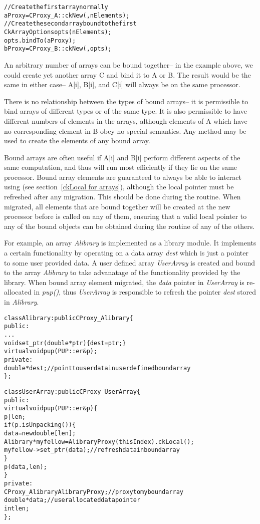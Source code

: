 \begin{alltt}
//Create the first array normally
  aProxy=CProxy_A::ckNew(,nElements);
//Create the second array bound to the first
  CkArrayOptions opts(nElements);
  opts.bindTo(aProxy);
  bProxy=CProxy_B::ckNew(,opts);
\end{alltt}

An arbitrary number of arrays can be bound together--
in the example above, we could create yet another array
C and bind it to A or B.  The result would be the same
in either case-- A[i], B[i], and C[i] will always be
on the same processor.

There is no relationship between the types of bound arrays--
it is permissible to bind arrays of different types or of the
same type.  It is also permissible to have different numbers
of elements in the arrays, although elements of A which have
no corresponding element in B obey no special semantics.
Any method may be used to create the elements of any bound
array.

Bound arrays are often useful if A[i] and B[i] perform different 
aspects of the same computation, and thus will run most efficiently 
if they lie on the same processor.  Bound array elements are guaranteed
to always be able to interact using  (see 
section~\ref{ckLocal for arrays}), although the local pointer must
be refreshed after any migration. This should be done during the 
routine. When migrated, all elements that are bound together will be created
at the new processor before  is called on any of them, ensuring that
a valid local pointer to any of the bound objects can be obtained during the
 routine of any of the others.

For example, an array {\it Alibrary} is implemented as a library module.
It implements a certain functionality by operating on a data array {\it dest}
which is just a pointer to some user provided data.
A user defined array {\it UserArray} is created and bound to 
the array {\it Alibrary} to take advanatage of the functionality provided 
by the library.
When bound array element migrated, the {\it data} pointer in {\it UserArray}
is re-allocated in {\it pup()}, thus {\it UserArray} is responsible to refresh
the pointer {\it dest} stored in {\it Alibrary}.

\begin{alltt}
class Alibrary: public CProxy_Alibrary \{
public:
  ...
  void set_ptr(double *ptr) \{ dest = ptr; \}
  virtual void pup(PUP::er &p);
private:
  double *dest;           // point to user data in user defined bound array
\};

class UserArray: public CProxy_UserArray \{
public:
  virtual void pup(PUP::er &p) \{
                p|len;
                if(p.isUnpacking()) \{ 
                  data = new double[len];
                  Alibrary *myfellow = AlibraryProxy(thisIndex).ckLocal();
                  myfellow->set_ptr(data);    // refresh data in bound array
                \}
                p(data, len);
  \}
private:
  CProxy_Alibrary  AlibraryProxy;   // proxy to my bound array
  double *data;          // user allocated data pointer
  int len;
\};
\end{alltt}


